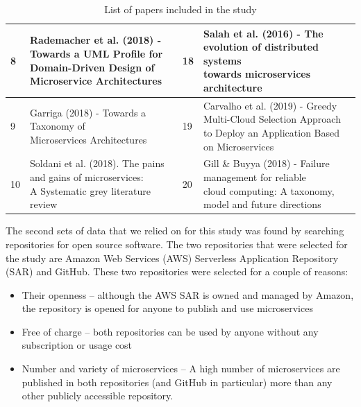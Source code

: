 \documentclass{article}
\begin{document}
\begin{table}[h!]
\begin{center}
\begin{tabular}{|l|l|l|l|}
      \hline
      8 & \makecell[l]{Rademacher et al. (2018) - Towards a UML Profile for \\ Domain-Driven Design of Microservice Architectures} & 18 & \makecell[l]{Salah et al. (2016) - The evolution of distributed systems \\ towards microservices architecture}\\
      \hline
      9 & \makecell[l]{Garriga (2018) - Towards a Taxonomy of \\ Microservices Architectures} & 19 & \makecell[l]{Carvalho et al. (2019) - Greedy Multi-Cloud Selection Approach \\ to Deploy an Application Based on Microservices}\\
      \hline
      10 & \makecell[l]{Soldani et al. (2018). The pains and gains of microservices: \\ 
      A Systematic grey literature review} & 20 & \makecell[l]{Gill \& Buyya (2018) - Failure management for reliable \\ cloud computing: A taxonomy, model and future directions}\\
      \hline
    \end{tabular}
        \caption{List of papers included in the study}
    \label{tab:Table 1}
  \end{center}
\end{table}

The second sets of data that we relied on for this study was found by searching repositories for open source software. The two repositories that were selected for the study are Amazon Web Services (AWS) Serverless Application Repository (SAR) and GitHub. These two repositories were selected for a couple of reasons:

\begin{itemize} 


\item Their openness – although the AWS SAR is owned and managed by Amazon, the repository is opened for anyone to publish and use microservices 
\item Free of charge – both repositories can be used by anyone without any subscription or usage cost
\item Number and variety of microservices – A high number of microservices are published in both repositories (and GitHub in particular) more than any other publicly accessible repository. 

\end{itemize}
\end{document}
